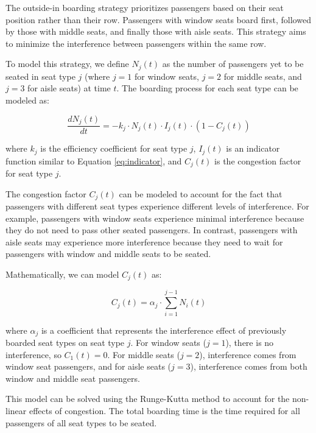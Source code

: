 \documentclass[12pt,a4paper]{article}
\begin{document}
The outside-in boarding strategy prioritizes passengers based on their seat position rather than their row. Passengers with window seats board first, followed by those with middle seats, and finally those with aisle seats. This strategy aims to minimize the interference between passengers within the same row.

To model this strategy, we define $N_j(t)$ as the number of passengers yet to be seated in seat type $j$ (where $j = 1$ for window seats, $j = 2$ for middle seats, and $j = 3$ for aisle seats) at time $t$. The boarding process for each seat type can be modeled as:

\begin{equation}
\frac{dN_j(t)}{dt} = -k_j \cdot N_j(t) \cdot I_j(t) \cdot (1 - C_j(t))
\label{eq:seat_type_boarding}
\end{equation}

where $k_j$ is the efficiency coefficient for seat type $j$, $I_j(t)$ is an indicator function similar to Equation \ref{eq:indicator}, and $C_j(t)$ is the congestion factor for seat type $j$.

The congestion factor $C_j(t)$ can be modeled to account for the fact that passengers with different seat types experience different levels of interference. For example, passengers with window seats experience minimal interference because they do not need to pass other seated passengers. In contrast, passengers with aisle seats may experience more interference because they need to wait for passengers with window and middle seats to be seated.

Mathematically, we can model $C_j(t)$ as:

\begin{equation}
C_j(t) = \alpha_j \cdot \sum_{i=1}^{j-1} N_i(t)
\label{eq:seat_type_congestion}
\end{equation}

where $\alpha_j$ is a coefficient that represents the interference effect of previously boarded seat types on seat type $j$. For window seats ($j = 1$), there is no interference, so $C_1(t) = 0$. For middle seats ($j = 2$), interference comes from window seat passengers, and for aisle seats ($j = 3$), interference comes from both window and middle seat passengers.

This model can be solved using the Runge-Kutta method to account for the non-linear effects of congestion. The total boarding time is the time required for all passengers of all seat types to be seated.
\end{document}
